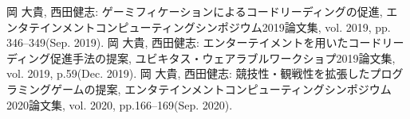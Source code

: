 \begin{thebibliography}{99}
  岡 大貴, 西田健志: ゲーミフィケーションによるコードリーディングの促進, エンタテインメントコンピューティングシンポジウム2019論文集, vol. 2019, pp. 346--349(Sep. 2019).
  岡 大貴, 西田健志: エンターテイメントを用いたコードリーディング促進手法の提案, ユビキタス・ウェアラブルワークショプ2019論文集, vol. 2019, p.59(Dec. 2019).
  岡 大貴, 西田健志: 競技性・観戦性を拡張したプログラミングゲームの提案, エンタテインメントコンピューティングシンポジウム2020論文集, vol. 2020, pp.166--169(Sep. 2020).
\end{thebibliography}